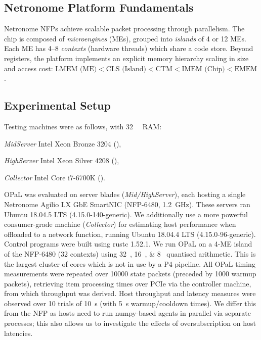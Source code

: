 \documentclass[
conference
,10pt
]{IEEEtran}
\newcommand{\approachshort}{OPaL}
\begin{document}
\subsection{Netronome Platform Fundamentals}\label{sec:netronome-platform-fundamentals}
Netronome NFPs achieve scalable packet processing through parallelism.
The chip is composed of \emph{microengines} (MEs), grouped into \emph{islands} of 4 or 12 MEs.
Each ME has \numrange{4}{8} \emph{contexts} (hardware threads) which share a code store.
Beyond registers, the platform implements an explicit memory hierarchy scaling in size and access cost:
$\text{LMEM (ME)} < \text{CLS (Island)} < \text{CTM} < \text{IMEM (Chip)} < \text{EMEM}$.

\subsection{Experimental Setup}\label{sec:experimental-setup}
Testing machines were as follows, with \SI{32}{\gibi\byte} RAM:
\begin{LaTeXdescription}
	\item[\emph{MidServer}] Intel Xeon Bronze 3204 (),
	\item[\emph{HighServer}] Intel Xeon Silver 4208 (),
	\item[\emph{Collector}] Intel Core i7-6700K ().
\end{LaTeXdescription}
\approachshort{} was evaluated on server blades (\emph{Mid/HighServer}), each hosting a single Netronome Agilio LX GbE SmartNIC (NFP-6480, \SI{1.2}{\giga\hertz}).
These servers ran Ubuntu 18.04.5 LTS (4.15.0-140-generic).
We additionally use a more powerful consumer-grade machine (\emph{Collector}) for estimating host performance when offloaded to a network function, running Ubuntu 18.04.4 LTS (4.15.0-96-generic).
Control programs were built using rustc 1.52.1.
We run \approachshort{} on a \num{4}-ME island of the NFP-6480 (\num{32} contexts) using \SIlist{32;16;8}{\bit} quantised arithmetic.
This is the largest cluster of cores which is not in use by a P4 pipeline.
All \approachshort{} timing measurements were repeated over \num{10000} state packets (preceded by \num{1000} warmup packets), retrieving item processing times over PCIe via the controller machine, from which throughput was derived.
Host throughput and latency measures were observed over \num{10} trials of \SI{10}{\second} (with \SI{5}{\second} warmup/cooldown times).
We differ this from the NFP as hosts need to run numpy-based agents in parallel via separate processes; this also allows us to investigate the effects of oversubscription on host latencies.
\end{document}
